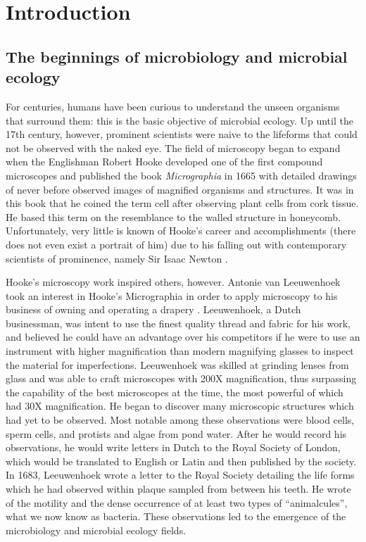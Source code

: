 \chapter{Introduction}
\section{The beginnings of microbiology and microbial ecology}
%
For centuries, humans have been curious to understand the unseen organisms that surround them: this is the basic objective of microbial ecology. Up until the 17th century, however, prominent scientists were naive to the lifeforms that could not be observed with the naked eye. The field of microscopy began to expand when the Englishman Robert Hooke developed one of the first compound microscopes and published the book \textit{Micrographia} \cite{Hooke1665} in 1665 with detailed drawings of never before observed images of magnified organisms and structures. It was in this book that he coined the term cell after observing plant cells from cork tissue. He based this term on the resemblance to the walled structure in honeycomb. Unfortunately, very little is known of Hooke's career and accomplishments (there does not even exist a portrait of him) due to his falling out with contemporary scientists of prominence, namely Sir Isaac Newton \cite{Espinasse1962}.	

Hooke's microscopy work inspired others, however. Antonie van Leeuwenhoek took an interest in Hooke's Micrographia in order to apply microscopy to his business of owning and operating a drapery \cite{Dobell1932}. Leeuwenhoek, a Dutch businessman, was intent to use the finest quality thread and fabric for his work, and believed he could have an advantage over his competitors if he were to use an instrument with higher magnification than modern magnifying glasses to inspect the material for imperfections. Leeuwenhoek was skilled at grinding lenses from glass and was able to craft microscopes with 200X magnification, thus surpassing the capability of the best microscopes at the time, the most powerful of which had 30X magnification. He began to discover many microscopic structures which had yet to be observed. Most notable among these observations were blood cells, sperm cells, and protists and algae from pond water. After he would record his observations, he would write letters in Dutch to the Royal Society of London, which would be translated to English or Latin and then published by the society. In 1683, Leeuwenhoek wrote a letter to the Royal Society detailing the life forms which he had observed within plaque sampled from between his teeth. He wrote of the motility and the dense occurrence of at least two types of ``animalcules'', what we now know as bacteria. These observations led to the emergence of the microbiology and microbial ecology fields.

